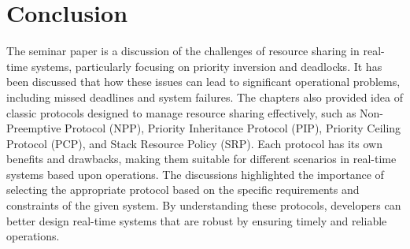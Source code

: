 \section{Conclusion}
The seminar paper is a discussion of the challenges of resource sharing in real-time systems, particularly focusing on priority inversion and deadlocks. It has been discussed that how these issues can lead to significant operational problems, including missed deadlines and system failures. The chapters also provided idea of classic protocols designed to manage resource sharing effectively, such as Non-Preemptive Protocol (NPP), Priority Inheritance Protocol (PIP), Priority Ceiling Protocol (PCP), and Stack Resource Policy (SRP). Each protocol has its own benefits and drawbacks, making them suitable for different scenarios in real-time systems based upon operations.
The discussions highlighted the importance of selecting the appropriate protocol based on the specific requirements and constraints of the given system. By understanding these protocols, developers can better design real-time systems that are robust by ensuring timely and reliable operations.


